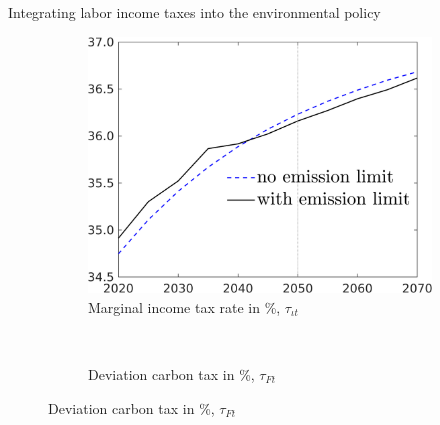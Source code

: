 \documentclass[11pt,aspectratio=169]{beamer}
\begin{document}
\begin{frame}{Integrating labor income taxes into the environmental policy}
	\pause
	\vspace{-3mm}
	\centering
	\begin{figure}[h!!]
		\centering
		
		\begin{subfigure}{0.45\textwidth}		
			\caption{{Marginal income tax rate in \%, $\tau_{\iota t}$}}
			\includegraphics[width=1\textwidth]{../codding_model/own_basedOnFried/optimalPol_010922_revision/figures/all_13Sept22/NewCalib_pol_TvsNoT_dTaulAv_base_emnet1_Sun2_spillover0_knspil3_xgr0_nsk0_sep0_extern0_PV1_etaa0.79_lgd1.png}
		\end{subfigure}
		\begin{minipage}[]{0.05\textwidth}
			\
		\end{minipage}
	\pause
		\begin{subfigure}{0.45\textwidth}		
			\caption{{Deviation carbon tax in \%, $\tau_{Ft}$}}

\end{subfigure}
\end{figure}
\end{frame}
\end{document}
